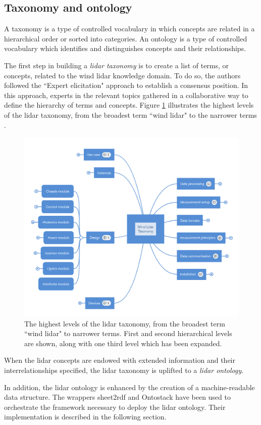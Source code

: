 \documentclass[remotesensing,article,submit,pdftex,moreauthors]{Definitions/mdpi}
\begin{document}
\subsection{Taxonomy and ontology}
A taxonomy is a type of controlled vocabulary in which concepts are related in a hierarchical order or sorted into categories.
An ontology is a type of controlled vocabulary
which identifies and distinguishes concepts and their relationships.

The first step in building a {\it lidar taxonomy} is to create a list of terms, or concepts, related to the wind lidar knowledge domain. To do so, the authors followed the ``Expert elicitation" approach to establish a consensus position. In this approach, experts in the relevant topics gathered in a collaborative way to define the hierarchy of terms and concepts. Figure \ref{fig:tax} illustrates the highest levels of the lidar taxonomy, from the broadest term ``wind lidar" to the narrower terms \cite{ref-IRPWind}.
\begin{figure}[h]
    \centering
    \includegraphics[width=12cm]{Figures/MindMap.PNG}
    \caption{The highest levels of the lidar taxonomy, from the broadest term ``wind lidar" to narrower terms. First and second hierarchical levels are shown, along with one third level which has been expanded.}
    \label{fig:tax}
\end{figure}
When the lidar concepts are endowed with extended information and their interrelationships specified, the lidar taxonomy is uplifted to a {\it lidar ontology}.

In addition, the lidar ontology is enhanced by the creation of a machine-readable data structure.
The wrappers sheet2rdf \cite{ref-Fiorelli2015} and Ontostack \cite{ref-OntoStack} have been used to orchestrate the framework necessary to deploy the lidar ontology. Their implementation is described in the following section.
\end{document}
